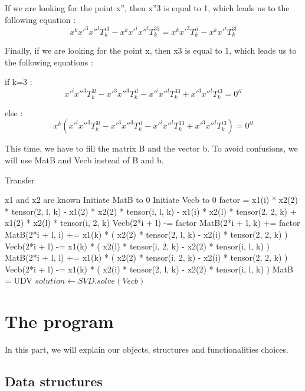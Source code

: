 \documentclass[a4paper,10pt]{report}
\begin{document}
If we are looking for the point x”, then x”3 is equal to 1, which leads us to the following equation :
\[x^{k}x'^{3}x''^{l}T^{i3}_{k} - x^{k}x'^{i}x''^{l}T^{33}_{k} = x^{k}x'^{3}T^{il}_{k} - x^{k}x'^{i}T^{3l}_{k}\]

Finally, if we are looking for the point x, then x3 is equal to 1, which leads us to the following equations :

if k=3 :
\[x'^{i}x''^{3}T^{3l}_{k} - x'^{3}x''^{3}T^{il}_{k} - x'^{i}x''^{l}T^{33}_{k} + x'^{3}x''^{l}T^{i3}_{k} = 0^{il}\]

else :
\[x^{k}(x'^{i}x''^{3}T^{3l}_{k} - x'^{3}x''^{3}T^{il}_{k} - x'^{i}x''^{l}T^{33}_{k} + x'^{3}x''^{l}T^{i3}_{k}) = 0^{il}\]

This time, we have to fill the matrix B and the vector b. To avoid confusions, we will use MatB and Vecb instead of B and b.

\begin{algorithm}
\caption{Transfer}
\begin{algorithmic}
\REQUIRE x1 and x2 are known
\STATE Initiate MatB to 0
\STATE Initiate Vecb to 0
\STATE factor = x1(i) * x2(2) * tensor(2, l, k) - x1(2) * x2(2) * tensor(i, l, k) - x1(i) * x2(l) * tensor(2, 2, k) + x1(2) * x2(l) * tensor(i, 2, k)
\STATE Vecb(2*i + l) -= factor
\ELSE
\STATE MatB(2*i + l, k) += factor
\ENDIF
{}
\STATE MatB(2*i + l, i) += x1(k) * ( x2(2) * tensor(2, l, k) - x2(i) * tensor(2, 2, k) )
\STATE Vecb(2*i + l) -= x1(k) * ( x2(l) * tensor(i, 2, k) - x2(2) * tensor(i, l, k) )
\STATE MatB(2*i + l, l) += x1(k) * ( x2(2) * tensor(i, 2, k) - x2(i) * tensor(2, 2, k) )
\STATE Vecb(2*i + l) -= x1(k) * ( x2(i) * tensor(2, l, k) - x2(2) * tensor(i, l, k) )
\ENDIF
\ENDFOR
\ENDFOR
\ENDFOR
\STATE MatB = UDV 
\STATE $solution \leftarrow SVD.solve(Vecb)$
\end{algorithmic}
\end{algorithm}


\chapter{The program}

In this part, we will explain our objects, structures and functionalities choices.
\\

\section{Data structures}
\end{document}
